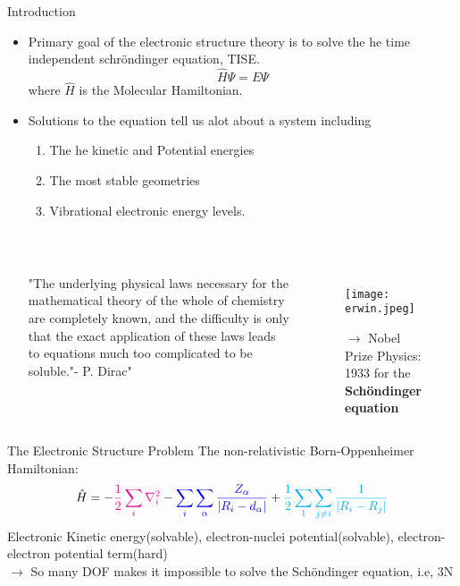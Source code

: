 \documentclass[10pt, aspectratio=169]{beamer}
\begin{document}
\begin{frame}{Introduction}
  \begin{itemize}
    \item Primary goal of the electronic structure theory is to solve the he time independent schröndinger equation, TISE.
    \begin{equation}
        \hat{H} \Psi = E\Psi
    \end{equation} where $\hat{H}$ is the Molecular Hamiltonian.
    \item Solutions to the equation tell us alot about a system including
    \begin{enumerate}
        \item The he kinetic and Potential energies
        \item The most stable geometries
        \item Vibrational electronic energy levels.
    \end{enumerate}\\
    
   \begin{columns}
       \scriptsize{"The underlying physical laws necessary for the  mathematical theory of the whole of chemistry are completely known, and the difficulty is only that the exact application of these laws leads to equations much too complicated to be soluble."- P. Dirac"}
       
       
       \vspace{-1cm}
       \begin{figure}
           \centering
           \texttt{[image: erwin.jpeg]}
           \caption*{$\rightarrow$ Nobel Prize Physics: 1933 for the \textbf{Sch\"ondinger equation}}
           \label{fig:enter-label}
       \end{figure}
   \end{columns}
    
  \end{itemize}
\end{frame}
\begin{frame}{The Electronic Structure Problem}
The non-relativistic Born-Oppenheimer Hamiltonian:
\begin{equation}
    \small{\hat{H} = 
      -{\color{magenta}\frac{1}{2}\sum_i \nabla^2_i} - {\color{blue}\sum_i\sum_{\alpha}\frac{Z_{\alpha}}{|R_i-d_{\alpha}|}} + {\color{cyan}\frac{1}{2}\sum_1\sum_{j\neq i} \frac{1}{|R_i - R_j|}}}
\end{equation}
{\color{magenta}Electronic Kinetic energy(solvable)}, 
{\color{blue}electron-nuclei potential}(solvable),
{\color{cyan}electron-electron potential term(hard)}\\
$\rightarrow$ So many DOF makes it impossible to solve the Schöndinger equation, i.e, 3N

    
\end{frame}
\end{document}
